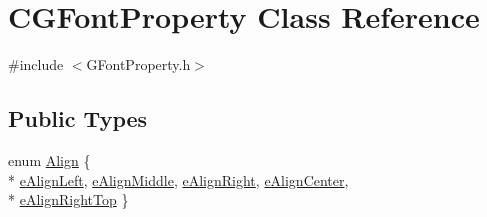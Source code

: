 \hypertarget{class_c_g_font_property}{}\section{C\+G\+Font\+Property Class Reference}
\label{class_c_g_font_property}


{\ttfamily \#include $<$G\+Font\+Property.\+h$>$}

\subsection*{Public Types}
\begin{DoxyCompactItemize}
\item 
enum \hyperlink{class_c_g_font_property_a78916b6f9d723f2ba7082f2b4f7fd1b7}{Align} \{ \\*
\hyperlink{class_c_g_font_property_a78916b6f9d723f2ba7082f2b4f7fd1b7a54f8a72228e41c46c52801c4784033e5}{e\+Align\+Left}, 
\hyperlink{class_c_g_font_property_a78916b6f9d723f2ba7082f2b4f7fd1b7a18c46de83bfbdbbd19c6c47966be2dd8}{e\+Align\+Middle}, 
\hyperlink{class_c_g_font_property_a78916b6f9d723f2ba7082f2b4f7fd1b7a5d831326b9a87cfe2c1fc31a77ff8e3c}{e\+Align\+Right}, 
\hyperlink{class_c_g_font_property_a78916b6f9d723f2ba7082f2b4f7fd1b7a2adbfb06a602478b82c5343ddbac0b55}{e\+Align\+Center}, 
\\*
\hyperlink{class_c_g_font_property_a78916b6f9d723f2ba7082f2b4f7fd1b7ac1a394be731b5e97314cc670cdf180a2}{e\+Align\+Right\+Top}
 \}
\end{DoxyCompactItemize}
